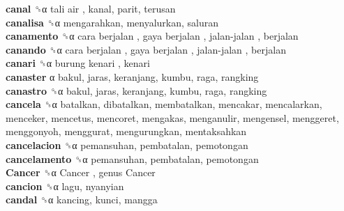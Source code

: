 \textbf{canal} ␝α   tali air , kanal, parit, terusan  \\
\textbf{canalisa} ␝α  mengarahkan, menyalurkan, saluran  \\
\textbf{canamento} ␝α   cara berjalan ,  gaya berjalan ,  jalan-jalan , berjalan  \\
\textbf{canando} ␝α   cara berjalan ,  gaya berjalan ,  jalan-jalan , berjalan  \\
\textbf{canari} ␝α   burung kenari , kenari  \\
\textbf{canaster} α  bakul, jaras, keranjang, kumbu, raga, rangking  \\
\textbf{canastro} ␝α  bakul, jaras, keranjang, kumbu, raga, rangking  \\
\textbf{cancela} ␝α  batalkan, dibatalkan, membatalkan, mencakar, mencalarkan, menceker, mencetus, mencoret, mengakas, menganulir, mengensel, menggeret, menggonyoh, menggurat, mengurungkan, mentaksahkan  \\
\textbf{cancelacion} ␝α  pemansuhan, pembatalan, pemotongan  \\
\textbf{cancelamento} ␝α  pemansuhan, pembatalan, pemotongan  \\
\textbf{Cancer} ␝α   Cancer ,  genus Cancer   \\
\textbf{cancion} ␝α  lagu, nyanyian  \\
\textbf{candal} ␝α  kancing, kunci, mangga  \\

